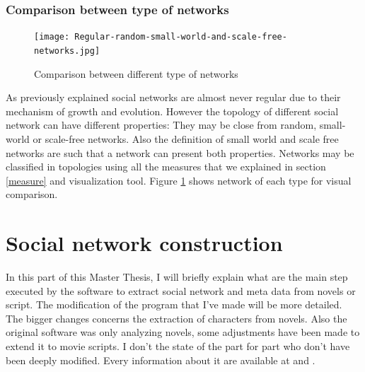 \documentclass[a4paper, 12pt]{report}
\begin{document}
\subsection{Comparison between type of networks}

\begin{figure}
\centering
\texttt{[image: Regular-random-small-world-and-scale-free-networks.jpg]}
\caption{Comparison between different type of networks \citep{img_comp}}
\label{comparison_networks}
\end{figure}

As previously explained social networks are almost never regular due to their mechanism of growth and evolution. However the topology of different social network can have different properties: They may be close from random, small-world or scale-free networks. Also the definition of small world and scale free networks are such that a network can present both properties. Networks may be classified in topologies using all the measures that we explained in section \ref{measure} and visualization tool. Figure \ref{comparison_networks} shows network of each type for visual comparison.



\chapter{Social network construction}

In this part of this Master Thesis, I will briefly explain what are the main step executed by the software to extract social network and meta data from novels or script. The modification of the program that I've made will be more detailed. The bigger changes concerns the extraction of characters from novels.  Also the original software was only analyzing novels, some adjustments have been made to extend it to movie scripts. I don't the state of the part for part who don't have been deeply modified. Every information about it are available at \cite{original} and \cite{original_thesis}. 
\end{document}
